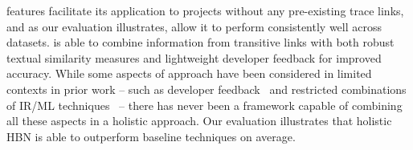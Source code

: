  \Comets features facilitate its application to projects without any pre-existing trace links, and as our evaluation illustrates, allow it to perform consistently well across datasets. \Comet is able to combine information from transitive links with both robust textual similarity measures and lightweight developer feedback for improved accuracy. While some aspects of \Comets approach have been considered in limited contexts in prior work -- such as developer feedback~\citep{DeLucia:ICSM'06,Hayes:TSE'06} and restricted combinations of IR/ML techniques~\citep{Gethers:ICSM'11} -- there has never been a framework capable of combining all these aspects in a holistic approach. Our evaluation illustrates that \Comets holistic HBN is able to outperform baseline techniques on average.

